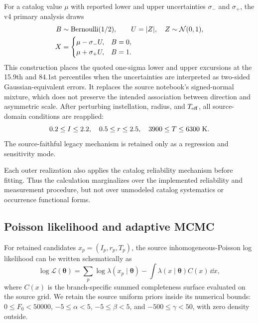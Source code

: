 For a catalog value $\mu$ with reported lower and upper uncertainties
$\sigma_-$ and $\sigma_+$, the v4 primary analysis draws
\begin{align}
 B&\sim{\rm Bernoulli}(1/2),\qquad U=|Z|,\quad Z\sim\mathcal{N}(0,1),\nonumber\\
 X&=\begin{cases}
 \mu-\sigma_-U,&B=0,\\
 \mu+\sigma_+U,&B=1.
 \end{cases}
 \label{eq:measurement_draw}
\end{align}
This construction places the quoted one-sigma lower and upper excursions at
the 15.9th and 84.1st percentiles when the uncertainties are interpreted as
two-sided Gaussian-equivalent errors. It replaces the source notebook's
signed-normal mixture, which does not preserve the intended association
between direction and asymmetric scale. After perturbing instellation, radius,
and $T_{\rm eff}$, all source-domain conditions are reapplied:
\begin{equation}
 0.2\leq I\leq2.2,
 \quad0.5\leq r\leq2.5,
 \quad3900\leq T\leq6300\ {\rm K}.
 \label{eq:source_domain}
\end{equation}
The source-faithful legacy mechanism is retained only as a regression and
sensitivity mode.

Each outer realization also applies the catalog reliability mechanism before
fitting. Thus the calculation marginalizes over the implemented reliability
and measurement procedure, but not over unmodeled catalog systematics or
occurrence functional forms.

\subsection{Poisson likelihood and adaptive MCMC}\label{subsec:mcmc}

For retained candidates $x_p=(I_p,r_p,T_p)$, the source inhomogeneous-Poisson
log likelihood can be written schematically as
\begin{equation}
 \log\mathcal{L}(\bm\theta)
 =\sum_p\log\lambda(x_p\mid\bm\theta)
 -\int\lambda(x\mid\bm\theta)C(x)\,\dd x,
 \label{eq:poisson_likelihood}
\end{equation}
where $C(x)$ is the branch-specific summed completeness surface evaluated on
the source grid. We retain the source uniform priors inside its numerical
bounds: $0\leq F_0<50000$, $-5\leq\alpha<5$,
$-5\leq\beta<5$, and $-500\leq\gamma<50$, with zero density outside.

